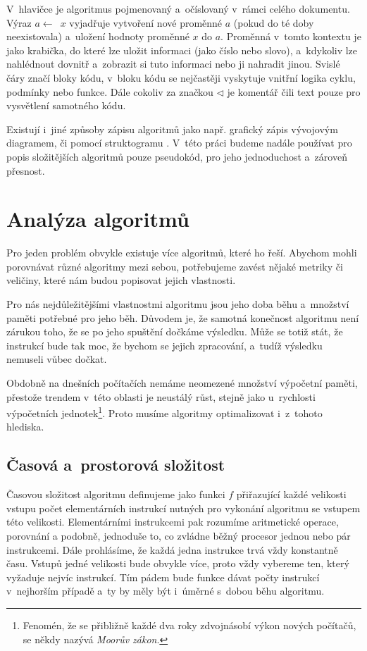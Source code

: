 \documentclass[12pt]{report}			%
\begin{document}
				V~hlavičce je algoritmus pojmenovaný a~očíslovaný v~rámci celého dokumentu. Výraz $a \gets$~$x$ vyjadřuje vytvoření nové proměnné $a$ (pokud do té doby neexistovala) a~uložení hodnoty proměnné $x$ do $a$. Proměnná v~tomto kontextu je jako krabička, do které lze uložit informaci (jako číslo nebo slovo), a~kdykoliv lze nahlédnout dovnitř a~zobrazit si tuto informaci nebo ji nahradit jinou. Svislé čáry značí bloky kódu, v~bloku kódu se nejčastěji vyskytuje vnitřní logika cyklu, podmínky nebo funkce. Dále cokoliv za značkou $\lhd$ je komentář čili text pouze pro vysvětlení samotného kódu.				
				

				Existují i~jiné způsoby zápisu algoritmů jako např. grafický zápis vývojovým diagramem, či pomocí struktogramu \cite{zaklady}. V~této práci budeme nadále používat pro popis složitějších algoritmů pouze pseudokód, pro jeho jednoduchost a~zároveň přesnost.
				
					
		\chapter{Analýza algoritmů}
		Pro jeden problém obvykle existuje více algoritmů, které ho řeší. Abychom mohli porovnávat různé algoritmy mezi sebou, potřebujeme  zavést nějaké metriky či veličiny, které nám budou popisovat jejich vlastnosti. 
		
		Pro nás nejdůležitějšími vlastnostmi algoritmu jsou jeho doba běhu a~množství paměti potřebné pro jeho běh. Důvodem je, že samotná konečnost algoritmu není zárukou toho, že se po jeho spuštění dočkáme výsledku. Může se totiž stát, že instrukcí bude tak moc, že bychom se jejich zpracování, a~tudíž výsledku nemuseli vůbec dočkat.
		
		Obdobně na dnešních počítačích nemáme neomezené množství výpočetní paměti, přestože trendem v~této oblasti je neustálý růst, stejně jako u~rychlosti výpočetních jednotek\footnote{Fenomén, že se přibližně každé dva roky zdvojnásobí výkon nových počítačů, se někdy nazývá \emph{Moorův zákon}.}. Proto musíme algoritmy optimalizovat i~z~tohoto hlediska. \cite{cerny}
		
		
			\section{Časová a~prostorová složitost}
			
			Časovou složitost algoritmu definujeme jako funkci $f$ přiřazující každé velikosti vstupu počet elementárních instrukcí nutných pro vykonání algoritmu se vstupem této velikosti. Elementárními instrukcemi pak rozumíme aritmetické operace, porovnání a podobně, jednoduše to, co zvládne běžný procesor jednou nebo pár instrukcemi. 
			Dále prohlásíme, že každá jedna instrukce trvá vždy konstantně času. Vstupů jedné velikosti bude obvykle více, proto vždy vybereme ten, který vyžaduje nejvíc instrukcí. Tím pádem bude funkce dávat počty instrukcí v~nejhorším případě a~ty by měly být i~úměrné s~dobou běhu algoritmu. \cite{pruvodce}
			
\end{document}
